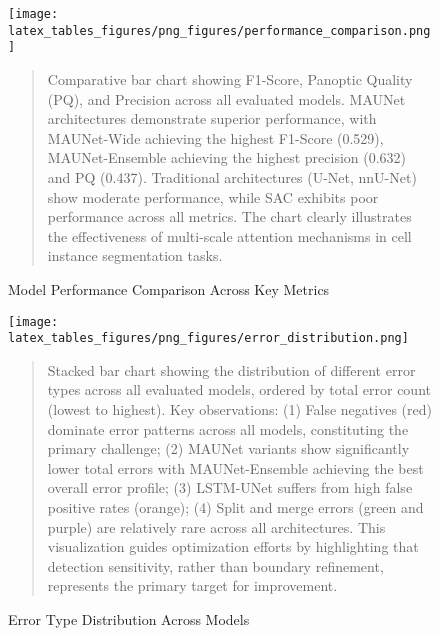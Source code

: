 
\begin{figure}[htbp]
\centering
\texttt{[image: latex\_tables\_figures/png\_figures/performance\_comparison.png]}
\caption{Model Performance Comparison Across Key Metrics}
\label{fig:performance_comparison_png}
\begin{quote}
\small
Comparative bar chart showing F1-Score, Panoptic Quality (PQ), and Precision across all evaluated models. MAUNet architectures demonstrate superior performance, with MAUNet-Wide achieving the highest F1-Score (0.529), MAUNet-Ensemble achieving the highest precision (0.632) and PQ (0.437). Traditional architectures (U-Net, nnU-Net) show moderate performance, while SAC exhibits poor performance across all metrics. The chart clearly illustrates the effectiveness of multi-scale attention mechanisms in cell instance segmentation tasks.
\end{quote}
\end{figure}

\begin{figure}[htbp]
\centering
\texttt{[image: latex\_tables\_figures/png\_figures/error\_distribution.png]}
\caption{Error Type Distribution Across Models}
\label{fig:error_distribution_png}
\begin{quote}
\small
Stacked bar chart showing the distribution of different error types across all evaluated models, ordered by total error count (lowest to highest). Key observations: (1) False negatives (red) dominate error patterns across all models, constituting the primary challenge; (2) MAUNet variants show significantly lower total errors with MAUNet-Ensemble achieving the best overall error profile; (3) LSTM-UNet suffers from high false positive rates (orange); (4) Split and merge errors (green and purple) are relatively rare across all architectures. This visualization guides optimization efforts by highlighting that detection sensitivity, rather than boundary refinement, represents the primary target for improvement.
\end{quote}
\end{figure}


